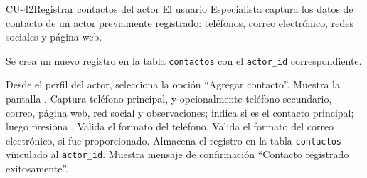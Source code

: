 \begin{UseCase}{CU-42}{Registrar contactos del actor}{
		El usuario Especialista captura los datos de contacto de un actor previamente registrado: teléfonos, correo electrónico, redes sociales y página web.
	}
{\begin{Titemize}
			\Titem Se crea un nuevo registro en la tabla \texttt{contactos} con el \texttt{actor\_id} correspondiente.
		\end{Titemize}
	}
\end{UseCase}
\begin{UCtrayectoria}
	\UCpaso[\UCactor] Desde el perfil del actor, selecciona la opción ``Agregar contacto''.
	\UCpaso Muestra la pantalla .
	\UCpaso[\UCactor] \label{CU-42.ingresaContactos} Captura teléfono principal, y opcionalmente teléfono secundario, correo, página web, red social y observaciones; indica si es el contacto principal; luego presiona .
	\UCpaso Valida el formato del teléfono. 
	\UCpaso Valida el formato del correo electrónico, si fue proporcionado. 
	\UCpaso Almacena el registro en la tabla \texttt{contactos} vinculado al \texttt{actor\_id}.
	\UCpaso Muestra mensaje de confirmación ``Contacto registrado exitosamente''.
\end{UCtrayectoria}

